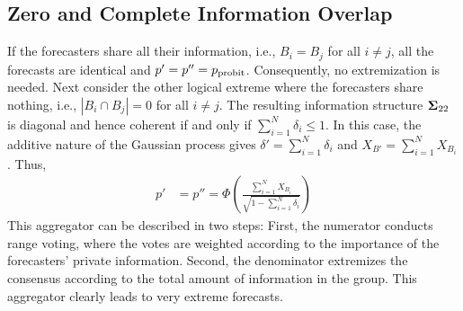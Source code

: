 \documentclass[12pt]{article}
\theoremstyle{definition}
\theoremstyle{definition}
\def\probit{p_{\rm probit}}
\begin{document}
\subsection{Zero and Complete Information Overlap}
\label{disjoint}
If the forecasters share all their information, i.e.,   $B_{i} = B_j$ for all $i \neq j$,  all the forecasts are identical and $p' = p'' = \probit$.
Consequently, no
extremization is needed. Next consider the other logical extreme where the forecasters share nothing, i.e.,  $|B_{i} \cap B_{j}| = 0$ for all $i \neq j$.
The resulting information structure ${\bf\Sigma}_{22}$ is
diagonal and hence coherent if and only if $\sum_{i=1}^N \delta_i
\leq 1$. In this case, the additive nature of the Gaussian process gives $\delta' = \sum_{i=1}^N \delta_i$ and $X_{B'} = \sum_{i=1}^N X_{B_i}$. Thus, 
 \begin{align*}
p' &= p'' =  \Phi\left( \frac{\sum_{i=1}^N X_{B_i}}
  {\sqrt{1- \sum_{i=1}^N \delta_i}} \right) 
\end{align*}
This aggregator can be described in two steps: First, the numerator conducts range voting,
 where the votes are weighted according to
the importance of the forecasters' private information.  
Second, the
denominator extremizes the consensus according to the total
amount of information in the group. 
This
aggregator clearly leads to very extreme forecasts. 


\end{document}
